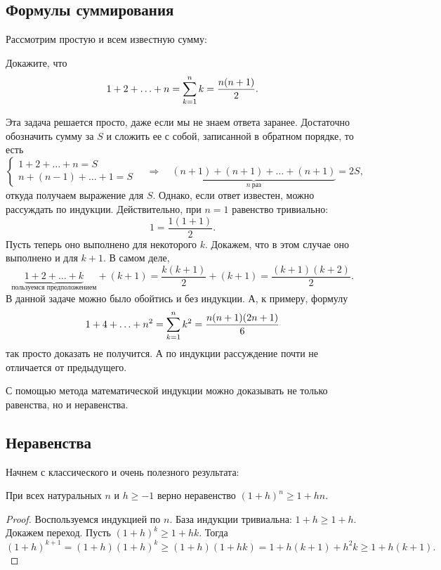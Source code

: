 \subsection{Формулы суммирования}
Рассмотрим простую и всем известную сумму:
\begin{task}
    Докажите, что
    \[
        1 + 2 + \ldots + n = \sum\limits_{k=1}^n k = \frac{n(n+1)}2.
        \]
\end{task}
Эта задача решается просто, даже если мы не знаем ответа заранее.
Достаточно обозначить сумму за $S$ и сложить ее с собой, записанной
в обратном порядке, то есть
\[
    \begin{cases}
        1 + 2 + \ldots + n = S\\
        n + (n-1) + \ldots + 1 = S
    \end{cases}
    \quad \Longrightarrow \quad
    \underbrace{(n+1) + (n+1) + \ldots + (n+1)}_{n\ \text{раз}} = 2S,
    \]
откуда получаем выражение для $S$. Однако, если ответ известен,
можно рассуждать по индукции. Действительно, при $n = 1$ равенство
тривиально:
\[
    1 = \frac{1(1+1)}2.
    \]
Пусть теперь оно выполнено для некоторого $k$. Докажем, что в этом
случае оно выполнено и для $k+1$. В самом деле,
\[
    \underbrace{1 + 2 + \ldots + k}_{\text{пользуемся предположением}}
    + (k+1) = \frac{k(k+1)}2 + (k+1) = \frac{(k+1)(k+2)}2.
    \]
В данной задаче можно было обойтись и без индукции. А, к примеру,
формулу
\[
    1 + 4 + \ldots + n^2 = \sum\limits_{k=1}^n k^2 = \frac{n(n+1)(2n+1)}6
    \]
так просто доказать не получится. А по индукции рассуждение почти
не отличается от предыдущего.

С помощью метода математической индукции можно доказывать не только
равенства, но и неравенства.

\subsection{Неравенства}
Начнем с классического и очень полезного результата:
\begin{theorem}
    При всех натуральных $n$ и $h \geqslant -1$ верно неравенство
    $(1+h)^n \geqslant 1 + hn$.
\end{theorem}
\begin{proof}
    Воспользуемся индукцией по $n$. База индукции тривиальна: $1 + h
    \geqslant 1 + h$. Докажем переход. Пусть $(1+h)^k \geqslant 1 + 
    hk$. Тогда
    \[
        (1+h)^{k+1} = (1+h)(1+h)^k \geqslant (1+h)(1+hk) = 
        1 + h(k+1) + h^2k \geqslant 1 + h(k+1).
        \]
\end{proof}

